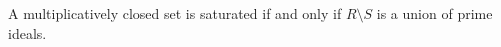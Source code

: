 A multiplicatively closed set is saturated if and only if $R\setminus S$ is a
union of prime ideals.
